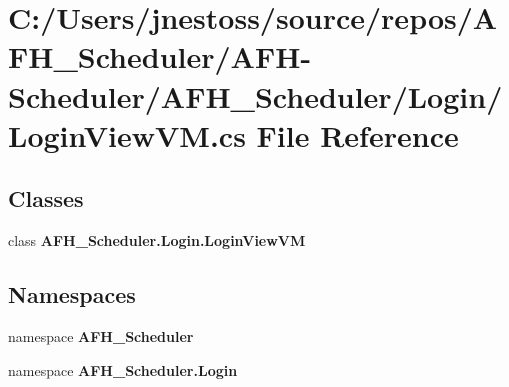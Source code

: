 \section{C\+:/\+Users/jnestoss/source/repos/\+A\+F\+H\+\_\+\+Scheduler/\+A\+F\+H-\/\+Scheduler/\+A\+F\+H\+\_\+\+Scheduler/\+Login/\+Login\+View\+VM.cs File Reference}
\label{_login_view_v_m_8cs}
\subsection*{Classes}
\begin{DoxyCompactItemize}
\item 
class \textbf{ A\+F\+H\+\_\+\+Scheduler.\+Login.\+Login\+View\+VM}
\end{DoxyCompactItemize}
\subsection*{Namespaces}
\begin{DoxyCompactItemize}
\item 
namespace \textbf{ A\+F\+H\+\_\+\+Scheduler}
\item 
namespace \textbf{ A\+F\+H\+\_\+\+Scheduler.\+Login}
\end{DoxyCompactItemize}
